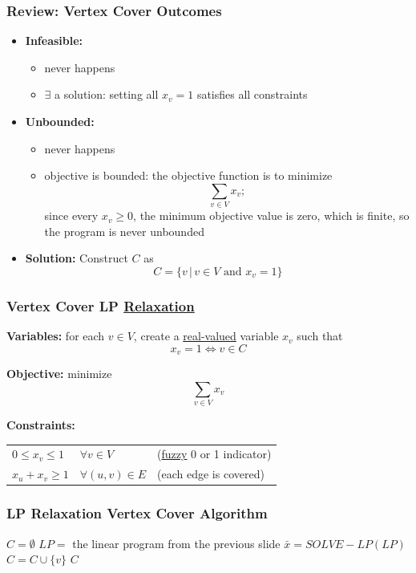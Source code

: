 \documentclass{beamer}
\begin{document}
\begin{frame} \frametitle{Review: Vertex Cover Outcomes}
  \begin{itemize}
    \item \textbf{Infeasible:}
      \begin{itemize}
      \item never happens
      \item $\exists$ a solution: setting all $x_v=1$ satisfies all constraints
      \end{itemize}
    \item \textbf{Unbounded:}
    \begin{itemize}
      \item never happens
      \item objective is bounded: the objective function is to minimize 
        \[ \sum_{v \in V} x_v; \]
        since every $x_v \geq 0$, the minimum objective value is zero, which is finite, so the program is never unbounded
    \end{itemize}
    \item \textbf{Solution:} Construct $C$ as
      \[ C = \{ v \,|\, v \in V \text{ and } x_v=1 \} \]
    \end{itemize}
\end{frame}

\begin{frame} \frametitle{Vertex Cover LP \underline{Relaxation}}
  \textbf{Variables:} for each $v \in V$, create a \underline{real-valued} variable $x_v$ such that
  \[ x_v = 1 \Leftrightarrow v \in C \]
  
  \textbf{Objective:} minimize
  \[ \sum_{v \in V} x_v \]
  
  \textbf{Constraints:}
  \begin{tabular}{lll}
    $0 \leq x_v \leq 1$ & $\forall v \in V$ & (\underline{fuzzy} 0 or 1 indicator) \\
    $x_u + x_v \geq 1$ & $\forall (u, v) \in E$ & (each edge is covered)
  \end{tabular}
  
\end{frame}

\begin{frame} \frametitle{LP Relaxation Vertex Cover Algorithm}
  \begin{algorithmic}[1]
      \State $C = \emptyset$
      \State $LP = $ the linear program from the previous slide
      \State $\bar{x} = SOLVE-LP(LP)$ 
         
          \State $C = C \cup \{v \}$
        \EndIf
      \EndFor
      \State \Return $C$
    \EndFunction
  \end{algorithmic}
\end{frame}
\end{document}
